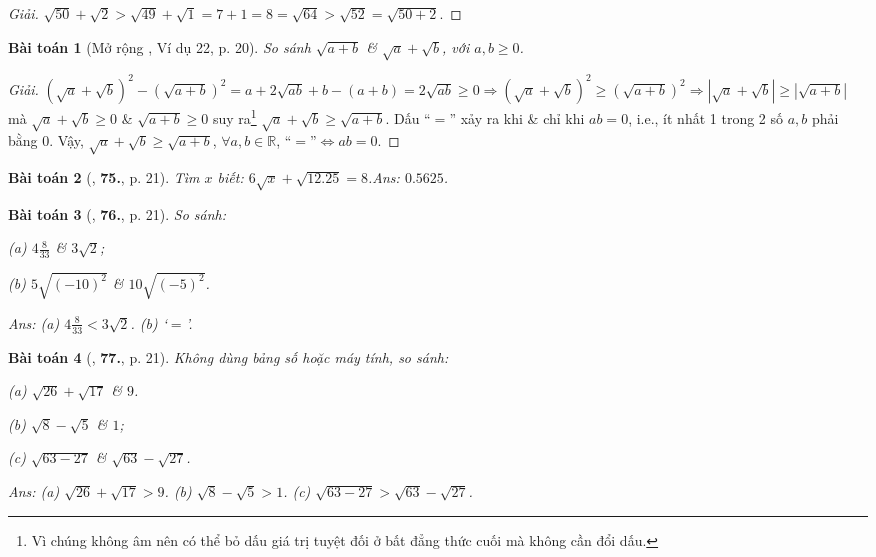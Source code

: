 \documentclass{article}
\numberwithin{equation}{section}
\newtheorem{baitoan}{Bài toán}
\begin{document}
\begin{proof}[Giải]
	$\sqrt{50} + \sqrt{2} > \sqrt{49} + \sqrt{1} = 7 + 1 = 8 = \sqrt{64} > \sqrt{52} = \sqrt{50 + 2}$.
\end{proof}

\begin{baitoan}[Mở rộng \cite{Tuyen_Toan_7}, Ví dụ 22, p. 20]
	So sánh $\sqrt{a + b}$ \& $\sqrt{a} + \sqrt{b}$, với $a,b\ge 0$.
\end{baitoan}

\begin{proof}[Giải]
	$(\sqrt{a} + \sqrt{b})^2 - (\sqrt{a + b})^2 = a + 2\sqrt{ab} + b - (a + b) = 2\sqrt{ab}\ge 0\Rightarrow(\sqrt{a} + \sqrt{b})^2\ge(\sqrt{a + b})^2\Rightarrow|\sqrt{a} + \sqrt{b}|\ge|\sqrt{a + b}|$ mà $\sqrt{a} + \sqrt{b}\ge 0$ \& $\sqrt{a + b}\ge 0$ suy ra\footnote{Vì chúng không âm nên có thể bỏ dấu giá trị tuyệt đối ở bất đẳng thức cuối mà không cần đổi dấu.} $\sqrt{a} + \sqrt{b}\ge\sqrt{a + b}$. Dấu ``$=$'' xảy ra khi \& chỉ khi $ab = 0$, i.e., ít nhất 1 trong 2 số $a,b$ phải bằng $0$. Vậy, $\sqrt{a} + \sqrt{b}\ge\sqrt{a + b}$, $\forall a,b\in\mathbb{R}$, ``$=$''$\Leftrightarrow ab = 0$.
\end{proof}

\begin{baitoan}[\cite{Tuyen_Toan_7}, \textbf{75.}, p. 21]
	Tìm $x$ biết: $6\sqrt{x} + \sqrt{12.25} = 8$.\hfill{\sf Ans:} $0.5625$.
\end{baitoan}

\begin{baitoan}[\cite{Tuyen_Toan_7}, \textbf{76.}, p. 21]
	So sánh:
	\begin{enumerate*}
		\item[(a)] $4\frac{8}{33}$ \& $3\sqrt{2}$;
		\item[(b)] $5\sqrt{(-10)^2}$ \& $10\sqrt{(-5)^2}$.
	\end{enumerate*}\hfill{\sf Ans:} (a) $4\frac{8}{33} < 3\sqrt{2}$. (b) `$=$'.
\end{baitoan}

\begin{baitoan}[\cite{Tuyen_Toan_7}, \textbf{77.}, p. 21]
	Không dùng bảng số hoặc máy tính, so sánh:
	\begin{enumerate*}
		\item[(a)] $\sqrt{26} + \sqrt{17}$ \& $9$.
		\item[(b)] $\sqrt{8} - \sqrt{5}$ \& $1$;
		\item[(c)] $\sqrt{63 - 27}$ \& $\sqrt{63} - \sqrt{27}$.
	\end{enumerate*}\hfill{\sf Ans:} (a) $\sqrt{26} + \sqrt{17} > 9$. (b) $\sqrt{8} - \sqrt{5} > 1$. (c) $\sqrt{63 - 27} > \sqrt{63} - \sqrt{27}$.
\end{baitoan}
\end{document}
